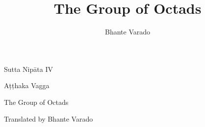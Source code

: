 \documentclass[10pt,twoside,final]{memoir}
\title{The Group of Octads}
\author{Bhante Varado}
\date{}
\begin{document}
\thispagestyle{empty}
{\centering\par

\vspace*{3\baselineskip}
Sutta Nip\=ata IV
\bigskip

A\d{t}\d{t}haka Vagga
\bigskip

The Group of Octads
\bigskip

Translated by Bhante Varado

}

\cleardoublepage


\tableofcontents*


% 
% 
% 



\setcounter{chapter}{0}

\pagestyle{octadpage}




\setcounter{chapter}{0}

\pagestyle{normalpage}
\end{document}
